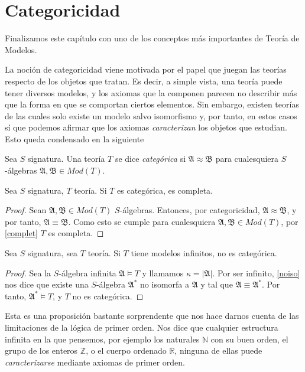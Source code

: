\section{Categoricidad}

Finalizamos este capítulo con uno de los conceptos más importantes de Teoría de Modelos. 

La noción de categoricidad viene motivada por el papel que juegan las teorías respecto de los objetos que tratan. Es decir, a simple vista, una teoría puede tener diversos modelos, y los axiomas que la componen parecen no describir más que la forma en que se comportan ciertos elementos. Sin embargo, existen teorías de las cuales solo existe un modelo salvo isomorfismo y, por tanto, en estos casos sí que podemos afirmar que los axiomas \textit{caracterizan} los objetos que estudian. Esto queda condensado en la siguiente 

\begin{definition}
Sea $S$ signatura. Una teoría $T$ se dice \textit{categórica} si $\mathfrak{A} \approx \mathfrak{B}$ para cualesquiera $S$-álgebras $\mathfrak{A}, \mathfrak{B} \in Mod(T)$. 
\end{definition}

\begin{prop}
Sea $S$ signatura, $T$ teoría. Si $T$ es categórica, es completa.
\end{prop}
\begin{proof}
Sean $\mathfrak{A}, \mathfrak{B} \in Mod(T)$ $S$-álgebras. Entonces, por categoricidad, $\mathfrak{A} \approx \mathfrak{B}$, y por tanto, $\mathfrak{A} \equiv \mathfrak{B}$. Como esto se cumple para cualesquiera $\mathfrak{A}, \mathfrak{B} \in Mod(T)$, por \ref{complet} $T$ es completa.
\end{proof}

\begin{prop}\label{infnocat}
Sea $S$ signatura, sea $T$ teoría. Si $T$ tiene modelos infinitos, no es categórica.
\end{prop}
\begin{proof}
Sea la $S$-álgebra infinita $\mathfrak{A}\vDash T$ y llamamos $\kappa= |\mathfrak{A}|$. Por ser infinito, \ref{noiso} nos dice que existe una $S$-álgebra $\mathfrak{A}^{*}$ no isomorfa a $\mathfrak{A}$ y tal que $\mathfrak{A} \equiv \mathfrak{A}^{*}$. Por tanto, $\mathfrak{A}^{*} \vDash T$, y $T$ no es categórica.
\end{proof}

Esta es una proposición bastante sorprendente que nos hace darnos cuenta de las limitaciones de la lógica de primer orden. Nos dice que cualquier estructura infinita en la que pensemos, por ejemplo los naturales $\mathbb{N}$ con su buen orden, el grupo de los enteros $\mathbb{Z}$, o el cuerpo ordenado $\mathbb{R}$, ninguna de ellas puede \textit{caracterizarse} mediante axiomas de primer orden.

